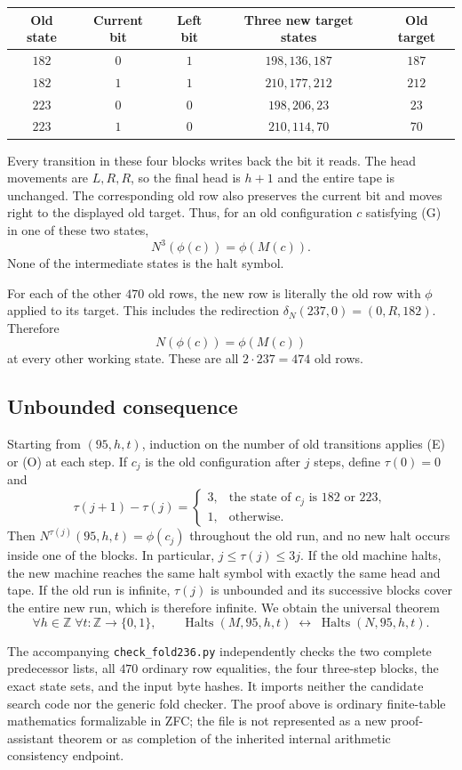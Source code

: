 \begin{center}
\begin{tabular}{ccccc}
Old state & Current bit & Left bit & Three new target states & Old target\\
\hline
$182$ & $0$ & $1$ & $198,136,187$ & $187$\\
$182$ & $1$ & $1$ & $210,177,212$ & $212$\\
$223$ & $0$ & $0$ & $198,206,23$ & $23$\\
$223$ & $1$ & $0$ & $210,114,70$ & $70$
\end{tabular}
\end{center}

Every transition in these four blocks writes back the bit it reads.  The
head movements are $L,R,R$, so the final head is $h+1$ and the entire tape is
unchanged.  The corresponding old row also preserves the current bit and
moves right to the displayed old target.  Thus, for an old configuration
$c$ satisfying (G) in one of these two states,
\[
 N^3(\phi(c))=\phi(M(c)).
 \tag{E}
\]
None of the intermediate states is the halt symbol.

For each of the other $470$ old rows, the new row is literally the old row
with $\phi$ applied to its target.  This includes the redirection
$\delta_N(237,0)=(0,R,182)$.  Therefore
\[
 N(\phi(c))=\phi(M(c))
 \tag{O}
\]
at every other working state.  These are all $2\cdot237=474$ old rows.

\subsection*{Unbounded consequence}

Starting from $(95,h,t)$, induction on the number of old transitions applies
(E) or (O) at each step.  If $c_j$ is the old configuration after $j$ steps,
define $\tau(0)=0$ and
\[
 \tau(j+1)-\tau(j)=
 \begin{cases}3,&\text{the state of }c_j\text{ is }182\text{ or }223,\\
 1,&\text{otherwise.}\end{cases}
\]
Then $N^{\tau(j)}(95,h,t)=\phi(c_j)$ throughout the old run, and no new halt
occurs inside one of the blocks.  In particular, $j\le\tau(j)\le3j$.
If the old machine halts, the new machine reaches the same halt symbol with
exactly the same head and tape.  If the old run is infinite, $\tau(j)$ is
unbounded and its successive blocks cover the entire new run, which is
therefore infinite.  We obtain the universal theorem
\[
 \forall h\in\mathbb Z\;\forall t:\mathbb Z\to\{0,1\},\qquad
 \operatorname{Halts}(M,95,h,t)
 \;\longleftrightarrow\;
 \operatorname{Halts}(N,95,h,t).
\]

The accompanying \texttt{check\_fold236.py} independently
checks the two complete predecessor lists, all $470$ ordinary row equalities,
the four three-step blocks, the exact state sets, and the input byte hashes.
It imports neither the candidate search code nor the generic fold checker.
The proof above is ordinary finite-table mathematics formalizable in ZFC;
the file is not represented as a new proof-assistant theorem or as completion
of the inherited internal arithmetic consistency endpoint.
